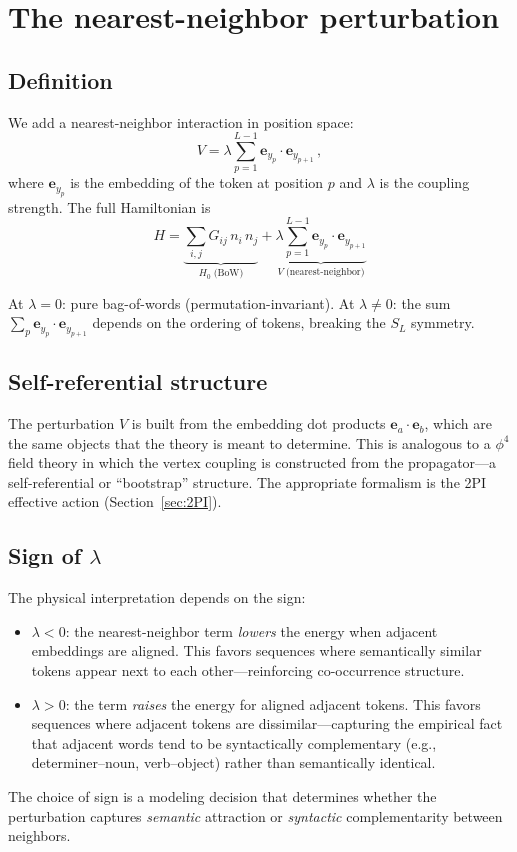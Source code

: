 \documentclass[11pt]{article}
\newcommand{\ee}{\bm{e}}
\begin{document}
\section{The nearest-neighbor perturbation}\label{sec:perturbation}

\subsection{Definition}

We add a nearest-neighbor interaction in position space:
\begin{equation}\label{eq:V}
    V = \lambda \sum_{p=1}^{L-1} \ee_{y_p} \cdot \ee_{y_{p+1}}\,,
\end{equation}
where $\ee_{y_p}$ is the embedding of the token at position $p$ and $\lambda$ is the coupling strength. The full Hamiltonian is
\begin{equation}\label{eq:full-H}
    \boxed{\;H = \underbrace{\sum_{i,j} G_{ij}\, n_i\, n_j}_{H_0\;\text{(BoW)}} + \underbrace{\lambda \sum_{p=1}^{L-1} \ee_{y_p} \cdot \ee_{y_{p+1}}}_{V\;\text{(nearest-neighbor)}}\;}
\end{equation}

At $\lambda = 0$: pure bag-of-words (permutation-invariant). At $\lambda \neq 0$: the sum $\sum_p \ee_{y_p} \cdot \ee_{y_{p+1}}$ depends on the ordering of tokens, breaking the $S_L$ symmetry.

\subsection{Self-referential structure}

The perturbation $V$ is built from the embedding dot products $\ee_a \cdot \ee_b$, which are the same objects that the theory is meant to determine. This is analogous to a $\phi^4$ field theory in which the vertex coupling is constructed from the propagator---a self-referential or ``bootstrap'' structure. The appropriate formalism is the 2PI effective action (Section~\ref{sec:2PI}).

\subsection{Sign of $\lambda$}

The physical interpretation depends on the sign:
\begin{itemize}
    \item $\lambda < 0$: the nearest-neighbor term \emph{lowers} the energy when adjacent embeddings are aligned. This favors sequences where semantically similar tokens appear next to each other---reinforcing co-occurrence structure.
    \item $\lambda > 0$: the term \emph{raises} the energy for aligned adjacent tokens. This favors sequences where adjacent tokens are dissimilar---capturing the empirical fact that adjacent words tend to be syntactically complementary (e.g., determiner--noun, verb--object) rather than semantically identical.
\end{itemize}
The choice of sign is a modeling decision that determines whether the perturbation captures \emph{semantic} attraction or \emph{syntactic} complementarity between neighbors.
\end{document}
